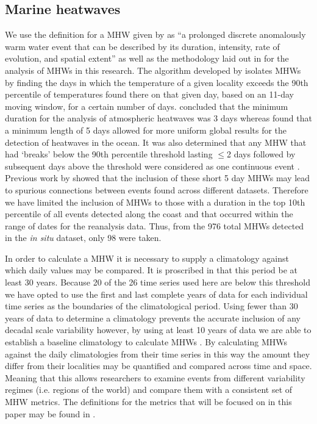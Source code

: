 \documentclass[a4paper,10pt,review]{elsarticle}
\begin{document}
\subsection{Marine heatwaves}
We use the definition for a MHW given by \citet{Hobday2016} as ``a prolonged discrete anomalously warm water event that can be described by its duration, intensity, rate of evolution, and spatial extent'' as well as the methodology laid out in \citet{Hobday2016} for the analysis of MHWs in this research. The algorithm developed by \citet{Hobday2016} isolates MHWs by finding the days in which the temperature of a given locality exceeds the 90th percentile of temperatures found there on that given day, based on an 11-day moving window, for a certain number of days. \citet{Perkins2013} concluded that the minimum duration for the analysis of atmospheric heatwaves was 3 days whereas \citet{Hobday2016} found that a minimum length of 5 days allowed for more uniform global results for the detection of heatwaves in the ocean. It was also determined that any MHW that had `breaks' below the 90th percentile threshold lasting $\leq$2 days followed by subsequent days above the threshold were considered as one continuous event \citep{Hobday2016}. Previous work by \citet{Schlegel2017} showed that the inclusion of these short 5 day MHWs may lead to spurious connections between events found across different datasets. Therefore we have limited the inclusion of MHWs to those with a duration in the top 10th percentile of all events detected along the coast and that occurred within the range of dates for the reanalysis data. Thus, from the 976 total MHWs detected in the \emph{in situ} dataset, only 98 were taken.

In order to calculate a MHW it is necessary to supply a climatology against which daily values may be compared. It is proscribed in \citet{Hobday2016} that this period be at least 30 years. Because 20 of the 26 time series used here are below this threshold we have opted to use the first and last complete years of data for each individual time series as the boundaries of the climatological period. Using fewer than 30 years of data to determine a climatology prevents the accurate inclusion of any decadal scale variability \citep{Schlegel2016} however, by using at least 10 years of data we are able to establish a baseline climatology to calculate MHWs \citep{Schlegel2017}. By calculating MHWs against the daily climatologies from their time series in this way the amount they differ from their localities may be quantified and compared across time and space. Meaning that this allows researchers to examine events from different variability regimes (i.e. regions of the world) and compare them with a consistent set of MHW metrics. The definitions for the metrics that will be focused on in this paper may be found in .
\end{document}
